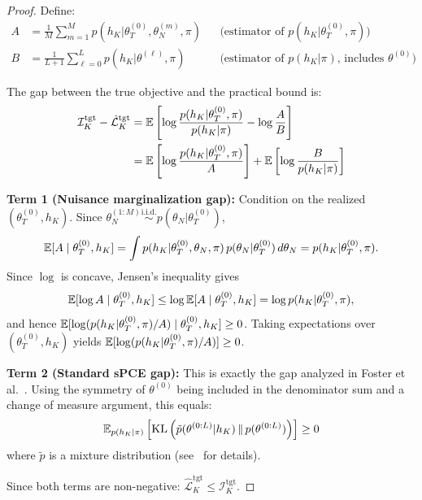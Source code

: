 \begin{proof}
Define:
\begin{align}
A &= \frac{1}{M}\sum_{m=1}^{M} p(h_K|\theta_T^{(0)}, \theta_N^{(m)}, \pi) & &\text{(estimator of } p(h_K|\theta_T^{(0)},\pi)\text{)} \\
B &= \frac{1}{L+1}\sum_{\ell=0}^{L} p(h_K|\theta^{(\ell)}, \pi) & &\text{(estimator of } p(h_K|\pi)\text{, includes } \theta^{(0)}\text{)}
\end{align}

The gap between the true objective and the practical bound is:
\begin{align}
\mathcal{I}_K^{\text{tgt}} - \hat{\mathcal{L}}_K^{\text{tgt}} &= \operatorname{\mathbb{E}}\left[\log \frac{p(h_K|\theta_T^{(0)},\pi)}{p(h_K|\pi)} - \log \frac{A}{B}\right] \\
&= \operatorname{\mathbb{E}}\left[\log \frac{p(h_K|\theta_T^{(0)},\pi)}{A}\right] + \operatorname{\mathbb{E}}\left[\log \frac{B}{p(h_K|\pi)}\right]
\end{align}

\textbf{Term 1 (Nuisance marginalization gap):} Condition on the realized $(\theta_T^{(0)}, h_K)$. Since $\theta_N^{(1:M)} \overset{\text{i.i.d.}}{\sim} p(\theta_N|\theta_T^{(0)})$,
\begin{equation}
\operatorname{\mathbb{E}}[A \mid \theta_T^{(0)}, h_K] = \int p(h_K|\theta_T^{(0)},\theta_N,\pi)\,p(\theta_N|\theta_T^{(0)})\,d\theta_N = p(h_K|\theta_T^{(0)},\pi).
\end{equation}
Since $\log$ is concave, Jensen's inequality gives
\begin{equation}
\operatorname{\mathbb{E}}[\log A \mid \theta_T^{(0)}, h_K] \leq \log \operatorname{\mathbb{E}}[A \mid \theta_T^{(0)}, h_K] = \log p(h_K|\theta_T^{(0)},\pi),
\end{equation}
and hence $\operatorname{\mathbb{E}}[\log(p(h_K|\theta_T^{(0)},\pi)/A) \mid \theta_T^{(0)}, h_K] \geq 0$. Taking expectations over $(\theta_T^{(0)}, h_K)$ yields $\operatorname{\mathbb{E}}[\log(p(h_K|\theta_T^{(0)},\pi)/A)] \geq 0$.

\textbf{Term 2 (Standard sPCE gap):} This is exactly the gap analyzed in Foster et al.~\cite{foster2021}. Using the symmetry of $\theta^{(0)}$ being included in the denominator sum and a change of measure argument, this equals:
\begin{equation}
\operatorname{\mathbb{E}}_{p(h_K|\pi)}\left[\text{KL}\left(\tilde{p}(\theta^{(0:L)}|h_K) \,\|\, p(\theta^{(0:L)})\right)\right] \geq 0
\end{equation}
where $\tilde{p}$ is a mixture distribution (see~\cite{foster2021} for details).

Since both terms are non-negative: $\hat{\mathcal{L}}_K^{\text{tgt}} \leq \mathcal{I}_K^{\text{tgt}}$.


\end{proof}
